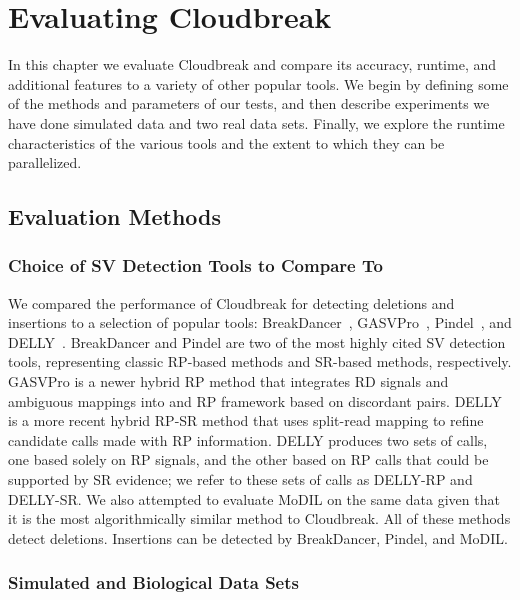 \chapter{Evaluating Cloudbreak}\label{chap_cloudbreak_eval}

In this chapter we evaluate Cloudbreak and compare its accuracy, runtime, and additional features to a variety of other popular tools. We begin by defining some of the methods and parameters of our tests, and then describe experiments we have done simulated data and two real data sets. Finally, we explore the runtime characteristics of the various tools and the extent to which they can be parallelized.

\section{Evaluation Methods}

\subsection{Choice of SV Detection Tools to Compare To}

We compared the performance of Cloudbreak for detecting deletions and insertions to a selection of popular tools: BreakDancer~\cite{Chen:2009p3}, GASVPro~\cite{Sindi:2012kk}, Pindel~\cite{Ye:2009p2}, and DELLY~\cite{Rausch:2012he}. BreakDancer and Pindel are two of the most highly cited SV detection tools, representing classic RP-based methods and SR-based methods, respectively. GASVPro is a newer hybrid RP method that integrates RD signals and ambiguous mappings into and RP framework based on discordant pairs. DELLY is a more recent hybrid RP-SR method that uses split-read mapping to refine candidate calls made with RP information. DELLY produces two sets of calls, one based solely on RP signals, and the other based on RP calls that could be supported by SR evidence; we refer to these sets of calls as DELLY-RP and DELLY-SR. We also attempted to evaluate MoDIL on the same data given that it is the most algorithmically similar method to Cloudbreak. All of these methods detect deletions. Insertions can be detected by BreakDancer, Pindel, and MoDIL. 

\subsection{Simulated and Biological Data Sets}\label{section_eval_data_sets}

